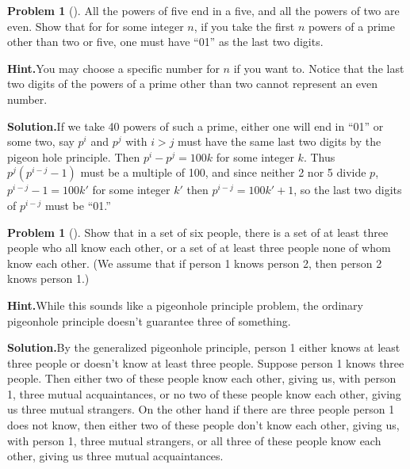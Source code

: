 \documentclass[10pt,]{book}
\theoremstyle{plain}
\theoremstyle{definition}
\newtheorem{activity}[project]{Problem}
\theoremstyle{definition}
\numberwithin{equation}{chapter}
\begin{document}
\begin{activity}[]\label{activity-64}
All the powers of five end in a five, and all the powers of two are even. Show that for for some integer \(n\), if you take the first \(n\) powers of a prime other than two or five, one must have ``01'' as the last two digits.%
\par\medskip\noindent%
\textbf{Hint.}\quad You may choose a specific number for \(n\) if you want to. Notice that the last two digits of the powers of a prime other than two cannot represent an even number.%
\par\medskip\noindent%
\textbf{Solution.}\quad If we take 40 powers of such a prime, either one will end in ``01'' or some two, say \(p^i\) and \(p^j\) with \(i>j\) must have the same last two digits by the pigeon hole principle. Then \(p^i-p^j=100k\) for some integer \(k\). Thus \(p^j(p^{i-j} -1)\) must be a multiple of 100, and since neither 2 nor 5 divide \(p\), \(p^{i-j} -1 = 100k'\) for some integer \(k'\) then \(p^{i-j} = 100k'+1\), so the last two digits of \(p^{i-j}\) must be ``01.''%
\end{activity}
\begin{activity}[]\label{R_3_3_}
Show that in a set of six people, there is a set of at least three people who all know each other, or a set of at least three people none of whom know each other. (We assume that if person 1 knows person 2, then person 2 knows person 1.)%
\par\medskip\noindent%
\textbf{Hint.}\quad While this sounds like a pigeonhole principle problem, the ordinary pigeonhole principle doesn't guarantee three of something.%
\par\medskip\noindent%
\textbf{Solution.}\quad By the generalized pigeonhole principle, person 1 either knows at least three people or doesn't know at least three people. Suppose person 1 knows three people. Then either two of these people know each other, giving us, with person 1, three mutual acquaintances, or no two of these people know each other, giving us three mutual strangers. On the other hand if there are three people person 1 does not know, then either two of these people don't know each other, giving us, with person 1, three mutual strangers, or all three of these people know each other, giving us three mutual acquaintances.%
\end{activity}
\end{document}
